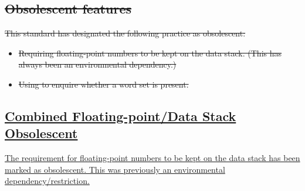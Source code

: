 \subsection[Obsolescent features]{\sout{Obsolescent features}}
\label{diff:94:obsolete}

	\sout{This standard has designated the following practice as obsolescent:}

\begin{itemize}
\item \sout{Requiring floating-point numbers to be kept on the data stack.
	(This has always been an environmental dependency.)}

\item \sout{Using  to enquire whether a word set is present.}
\end{itemize}

\subsection[Combined Floating-point/Data Stack Obsolescent]{\uline{Combined Floating-point/Data Stack Obsolescent}} %
\label{diff:fpstack}

\uline{The requirement for floating-point numbers to be kept on the data stack
has been marked as obsolescent.  This was previously an environmental
dependency/restriction.}

